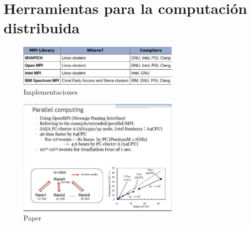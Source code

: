 \section{Herramientas para la computación distribuida}
\begin{figure}[H]
    \centering
  \includegraphics[width=0.7\textwidth]{images/compil.jpg}
  \caption{Implementaciones}
  \label{acce}
\end{figure}


\begin{figure}[H]
    \centering
  \includegraphics[width=0.7\textwidth]{images/paper.jpg}
  \caption{Paper}
  \label{acce}
\end{figure}

\newpage